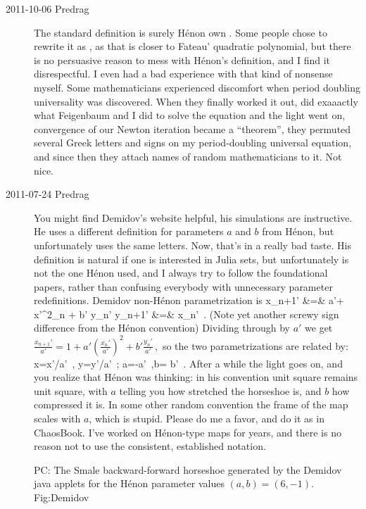 \begin{description}
\item[2011-10-06 Predrag]
The standard definition is surely H\'enon own .
Some people chose to rewrite it as , as that is closer to
Fateau' quadratic polynomial, but there is no persuasive reason to mess
with H\'enon's definition, and I find it disrespectful. I even had a bad
experience with that kind of nonsense myself. Some mathematicians
experienced discomfort when period doubling universality was discovered.
When they finally worked it out, did exaaactly what Feigenbaum and I did
to solve the equation and the light went on, convergence of our Newton
iteration became a ``theorem'', they permuted several Greek letters and
signs on my period-doubling universal equation, and since then they
attach names of random mathematicians to it. Not nice.

\item[2011-07-24 Predrag]
                                    \toCB
You might find Demidov's website helpful, his simulations
are instructive. He uses a different definition for parameters $a$ and
$b$ from H\'enon, but unfortunately uses the same letters. Now, that's in
a really bad taste. His definition is natural if one is interested in
Julia sets, but unfortunately is not the one H\'enon used, and I always
try to follow the foundational papers, rather than confusing everybody
with unnecessary parameter redefinitions. Demidov
non-H\'enon  parametrization is
\bea
    x_{n+1}' &=& a'+ {x'}{}^2_n + b' y_n'
        \continue
    y_{n+1}' &=& x_n'
\,.
\label{DemidHen}
\eea
(Note yet another screwy sign difference from the H\'enon convention)
Dividing through by $a'$ we get
\(
\frac{x_{n+1}'}{a'} = 1 + a'\left(\frac{x_n'}{a'}\right)^2 + b'\frac{y_n'}{a'}
\,,
\)
so the two parametrizations are related by:
\beq
x={x'}/{a'}
\,,\quad
y={y'}/{a'}
\,;\qquad
a=-{a'}
\,,\quad b= {b'}
\,.
After a while the light goes on, and you realize that H\'enon was
thinking: in his convention unit square remains unit square, with $a$
telling you how stretched the horseshoe is, and $b$ how compressed it is.
In some other random convention the frame of the map scales with $a$,
which is stupid. Please do me a favor, and do it as in ChaosBook. I've
worked on H\'enon-type maps for years, and there is no reason not to use
the consistent, established notation.

{}{
PC: The Smale backward-forward horseshoe generated by the
Demidov java applets for the H\'enon parameter values
$(a,b) = (6,-1)$.
    }{Fig:Demidov}



\end{description}
